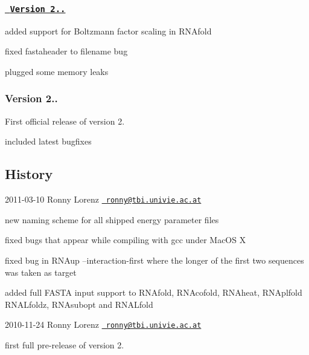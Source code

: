 \subsubsection*{\href{https://github.com/ViennaRNA/ViennaRNA/compare/v2.0.1...v2.0.2}{\texttt{ Version 2..}}}


\begin{DoxyItemize}
\item added support for Boltzmann factor scaling in R\+N\+Afold
\item fixed fastaheader to filename bug
\item plugged some memory leaks
\end{DoxyItemize}

\subsubsection*{Version 2..}


\begin{DoxyItemize}
\item First official release of version 2.
\item included latest bugfixes
\end{DoxyItemize}

\subsection*{History}

2011-\/03-\/10 Ronny Lorenz \href{mailto:ronny@tbi.univie.ac.at}{\texttt{ ronny@tbi.\+univie.\+ac.\+at}}


\begin{DoxyItemize}
\item new naming scheme for all shipped energy parameter files
\item fixed bugs that appear while compiling with gcc under Mac\+OS X
\item fixed bug in R\+N\+Aup --interaction-\/first where the longer of the first two sequences was taken as target
\item added full F\+A\+S\+TA input support to R\+N\+Afold, R\+N\+Acofold, R\+N\+Aheat, R\+N\+Aplfold R\+N\+A\+Lfoldz, R\+N\+Asubopt and R\+N\+A\+Lfold
\end{DoxyItemize}

2010-\/11-\/24 Ronny Lorenz \href{mailto:ronny@tbi.univie.ac.at}{\texttt{ ronny@tbi.\+univie.\+ac.\+at}}


\begin{DoxyItemize}
\item first full pre-\/release of version 2.
\end{DoxyItemize}

